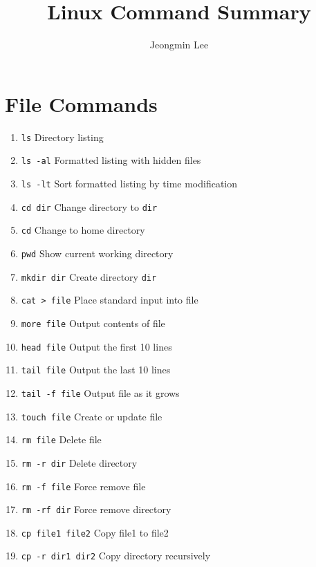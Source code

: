 \documentclass[a4paper,12pt]{article}
\title{Linux Command Summary}
\author{Jeongmin Lee}
\date{}
\begin{document}
\maketitle

\section{File Commands}
\begin{enumerate}
  \item \texttt{ls} \quad Directory listing
  \item \texttt{ls -al} \quad Formatted listing with hidden files
  \item \texttt{ls -lt} \quad Sort formatted listing by time modification
  \item \texttt{cd dir} \quad Change directory to \texttt{dir}
  \item \texttt{cd} \quad Change to home directory
  \item \texttt{pwd} \quad Show current working directory
  \item \texttt{mkdir dir} \quad Create directory \texttt{dir}
  \item \texttt{cat > file} \quad Place standard input into file
  \item \texttt{more file} \quad Output contents of file
  \item \texttt{head file} \quad Output the first 10 lines
  \item \texttt{tail file} \quad Output the last 10 lines
  \item \texttt{tail -f file} \quad Output file as it grows
  \item \texttt{touch file} \quad Create or update file
  \item \texttt{rm file} \quad Delete file
  \item \texttt{rm -r dir} \quad Delete directory
  \item \texttt{rm -f file} \quad Force remove file
  \item \texttt{rm -rf dir} \quad Force remove directory
  \item \texttt{cp file1 file2} \quad Copy file1 to file2
  \item \texttt{cp -r dir1 dir2} \quad Copy directory recursively
\end{enumerate}
\end{document}
